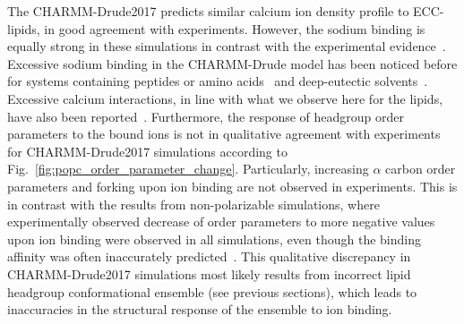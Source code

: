 \documentclass[journal=jacsat,manuscript=article,layout=singlecolumn]{achemso}
\begin{document}
The CHARMM-Drude2017 predicts similar calcium ion density profile to ECC-lipids, in good agreement with experiments. However, the sodium binding is equally strong in these simulations in contrast with the experimental evidence~\cite{Catte2016}. 
Excessive sodium binding in the CHARMM-Drude model has been noticed before for systems containing peptides or amino acids~\cite{Ngo2019, Kav2022} and deep-eutectic solvents~\cite{shayestehpour2022ion}. Excessive calcium interactions, in line with what we observe here for the lipids, have also been reported~\cite{Tan2022}. Furthermore, the response of headgroup order parameters to the bound ions is not in qualitative agreement with experiments for CHARMM-Drude2017 simulations according to Fig.~\ref{fig:popc_order_parameter_change}. Particularly, increasing $\alpha$ carbon order parameters and forking upon ion binding are not observed in experiments. This is in contrast with the results from non-polarizable simulations, where experimentally observed decrease of order parameters to more negative values upon ion binding were observed in all simulations, even though the binding affinity was often inaccurately predicted~\cite{Catte2016}. This qualitative discrepancy in CHARMM-Drude2017 simulations most likely results from incorrect lipid headgroup conformational ensemble (see previous sections), which leads to inaccuracies in the structural response of the ensemble to ion binding. 
\end{document}

